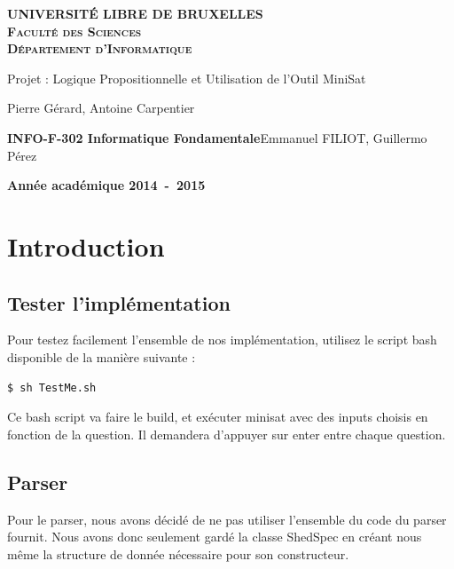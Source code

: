 \documentclass[a4paper,11pt]{article}
\begin{document}
\begin{titlepage}
\begin{center}
\textbf{\textsc{UNIVERSIT\'E LIBRE DE BRUXELLES}}\\
\textbf{\textsc{Faculté des Sciences}}\\
\textbf{\textsc{Département d'Informatique}}
\vfill{}\vfill{}
\begin{center}{\Huge Projet : Logique Propositionnelle et Utilisation de l’Outil MiniSat}\end{center}{\Huge \par}
\begin{center}{\large Pierre Gérard, Antoine Carpentier}\end{center}{\Huge \par}
\vfill{}\vfill{} \vfill{}
\begin{flushleft}{\large \textbf{INFO-F-302 Informatique Fondamentale}}\hfill{Emmanuel FILIOT, Guillermo Pérez}\end{flushleft}{\large\par}
\vfill{}\vfill{}\enlargethispage{3cm}
\textbf{Année académique 2014~-~2015}
\end{center}
\end{titlepage}



\tableofcontents

\pagebreak

\section{Introduction}

\subsection{Tester l'implémentation}
Pour testez facilement l'ensemble de nos implémentation, utilisez le script bash disponible de la manière suivante :
\begin{lstlisting}
$ sh TestMe.sh	
\end{lstlisting}
Ce bash script va faire le build, et exécuter minisat avec des inputs choisis en fonction de la question. Il demandera d'appuyer sur enter entre chaque question.

\subsection{Parser}
Pour le parser, nous avons décidé de ne pas utiliser l'ensemble du code du parser fournit. Nous avons donc seulement gardé la classe ShedSpec en créant nous même la structure de donnée nécessaire pour son constructeur.
\end{document}
